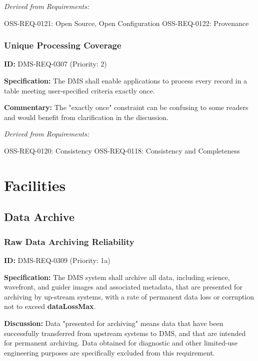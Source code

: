 \documentclass[SE,toc,lsstdraft]{lsstdoc}
\begin{document}
\emph{Derived from Requirements:}

OSS-REQ-0121:
Open Source, Open Configuration \newline
OSS-REQ-0122:
Provenance \newline

\subsubsection{Unique Processing Coverage}

\label{DMS-REQ-0307}
\textbf{ID:} DMS-REQ-0307 (Priority: 2)

\textbf{Specification:} The DMS shall enable applications to process every record in a table meeting user-specified criteria exactly once.

\textbf{Commentary: }The "exactly once" constraint can be confusing to some readers and would benefit from clarification in the discussion.

\emph{Derived from Requirements:}

OSS-REQ-0120:
Consistency \newline
OSS-REQ-0118:
Consistency and Completeness \newline

\section{Facilities}

\subsection{Data Archive}

\subsubsection{Raw Data Archiving Reliability}

\label{DMS-REQ-0309}
\textbf{ID:} DMS-REQ-0309 (Priority: 1a)

\textbf{Specification:} The DMS system shall archive all data, including science, wavefront, and guider images and associated metadata, that are presented for archiving by up-stream systems, with a rate of permanent data loss or corruption not to exceed \textbf{dataLossMax}.

\textbf{Discussion: }Data "presented for archiving" means data that have been successfully transferred from upstream systems to DMS, and that are intended for permanent archiving. Data obtained for diagnostic and other limited-use engineering purposes are specifically excluded from this requirement.
\end{document}
